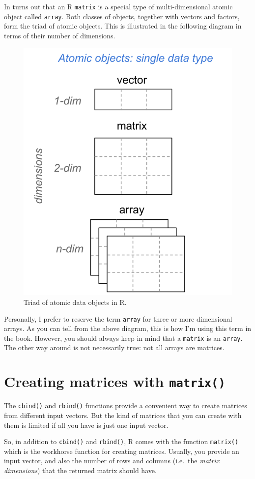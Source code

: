 \documentclass[
]{book}
\begin{document}
In turns out that an R \texttt{matrix} is a special type of multi-dimensional atomic
object called \texttt{array}. Both classes of objects, together with vectors and
factors, form the triad of atomic objects. This is illustrated in the following
diagram in terms of their number of dimensions.

\begin{figure}

{\centering \includegraphics[width=0.5\linewidth]{images/objects/obj-atomics} 

}

\caption{Triad of atomic data objects in R.}\label{fig:unnamed-chunk-105}
\end{figure}

Personally, I prefer to reserve the term \texttt{array} for three or more dimensional
arrays. As you can tell from the above diagram, this is how I'm using this
term in the book. However, you should always keep in mind that a \texttt{matrix} is an
\texttt{array}. The other way around is not necessarily true: not all arrays are
matrices.

\hypertarget{creating-matrices-with-matrix}{%
\section{\texorpdfstring{Creating matrices with \texttt{matrix()}}{Creating matrices with matrix()}}\label{creating-matrices-with-matrix}}

The \texttt{cbind()} and \texttt{rbind()} functions provide a convenient way to create
matrices from different input vectors. But the kind of matrices that you can
create with them is limited if all you have is just one input vector.

So, in addition to \texttt{cbind()} and \texttt{rbind()}, R comes with the function \texttt{matrix()}
which is the workhorse function for creating matrices. Usually, you provide
an input vector, and also the number of rows and columns (i.e.~the
\emph{matrix dimensions}) that the returned matrix should have.
\end{document}
